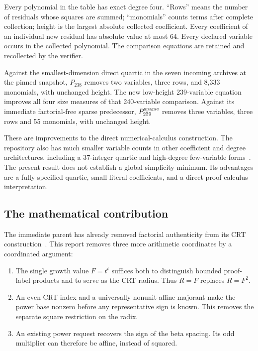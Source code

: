 Every polynomial in the table has exact degree four. ``Rows'' means the
number of residuals whose squares are summed; ``monomials'' counts terms
after complete collection; height is the largest absolute collected
coefficient. Every coefficient of an individual new residual has absolute
value at most 64. Every declared variable occurs in the collected polynomial.
The comparison equations are retained and recollected by the verifier.

Against the smallest-dimension direct quartic in the seven incoming
archives at the pinned snapshot, $P_{238}$ removes two variables, three
rows, and 8,333 monomials, with unchanged height. The new low-height
239-variable equation improves all four size measures of that 240-variable
comparison. Against its immediate factorial-free sparse predecessor,
$P_{239}^{\rm sparse}$ removes three variables, three rows and 55 monomials,
with unchanged height.

These are improvements to the direct numerical-calculus construction.
The repository also has much smaller variable counts in other coefficient
and degree architectures, including a 37-integer quartic and high-degree
few-variable forms~\cite{repo}. The present result does not establish a
global simplicity minimum. Its advantages are a fully specified quartic,
small literal coefficients, and a direct proof-calculus interpretation.

\subsection{The mathematical contribution}

The immediate parent has already removed factorial authenticity from its
CRT construction~\cite{factorialfree}. This report removes three more
arithmetic coordinates by a coordinated argument:

\begin{enumerate}
\item The single growth value $F=t^t$ suffices both to distinguish bounded
      proof-label products and to serve as the CRT radius. Thus $R=F$
      replaces $R=F^2$.
\item An even CRT index and a universally nonunit affine majorant make the
      power base nonzero before any representative sign is known. This
      removes the separate square restriction on the radix.
\item An existing power request recovers the sign of the beta spacing.
      Its odd multiplier can therefore be affine, instead of squared.
\end{enumerate}


